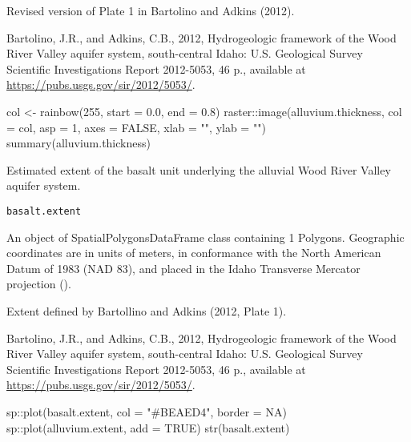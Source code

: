 \documentclass[a4paper]{book}
\begin{document}
%
\begin{Source}\relax
Revised version of Plate 1 in Bartolino and Adkins (2012).
\end{Source}
%
\begin{References}\relax
Bartolino, J.R., and Adkins, C.B., 2012,
Hydrogeologic framework of the Wood River Valley aquifer system, south-central Idaho:
U.S. Geological Survey Scientific Investigations Report 2012-5053, 46 p.,
available at \url{https://pubs.usgs.gov/sir/2012/5053/}.
\end{References}
%
\begin{Examples}
\begin{ExampleCode}
col <- rainbow(255, start = 0.0, end = 0.8)
raster::image(alluvium.thickness, col = col, asp = 1, axes = FALSE,
              xlab = "", ylab = "")
summary(alluvium.thickness)

\end{ExampleCode}
\end{Examples}
%
\begin{Description}\relax
Estimated extent of the basalt unit underlying the alluvial Wood River Valley aquifer system.
\end{Description}
%
\begin{Usage}
\begin{verbatim}
basalt.extent
\end{verbatim}
\end{Usage}
%
\begin{Format}
An object of SpatialPolygonsDataFrame class containing 1 Polygons.
Geographic coordinates are in units of meters, in conformance with the
North American Datum of 1983 (NAD 83), and placed in the
Idaho Transverse Mercator projection ().
\end{Format}
%
\begin{Source}\relax
Extent defined by Bartollino and Adkins (2012, Plate 1).
\end{Source}
%
\begin{References}\relax
Bartolino, J.R., and Adkins, C.B., 2012,
Hydrogeologic framework of the Wood River Valley aquifer system, south-central Idaho:
U.S. Geological Survey Scientific Investigations Report 2012-5053, 46 p.,
available at \url{https://pubs.usgs.gov/sir/2012/5053/}.
\end{References}
%
\begin{Examples}
\begin{ExampleCode}
sp::plot(basalt.extent, col = "#BEAED4", border = NA)
sp::plot(alluvium.extent, add = TRUE)
str(basalt.extent)

\end{ExampleCode}
\end{Examples}
\end{document}

